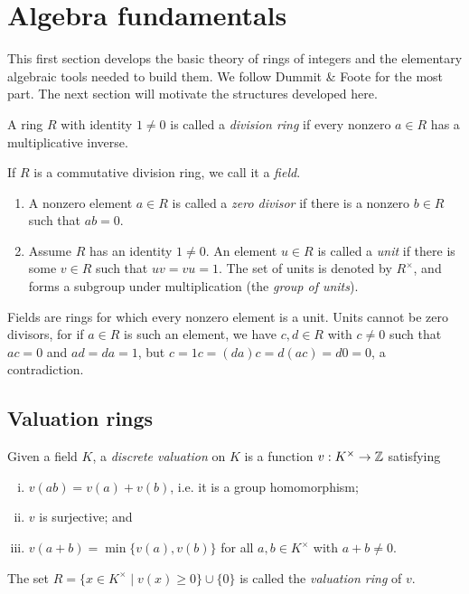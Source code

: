 \section{Algebra fundamentals}

This first section develops the basic theory of rings of integers and the elementary algebraic tools needed to build them. We follow Dummit \& Foote for the most part. The next section will motivate the structures developed here.

\begin{defn}[D\&F pp. 224]
	A ring $R$ with identity $1\neq 0$ is called a \emph{division ring} if every nonzero $a\in R$ has a multiplicative inverse.

	If $R$ is a commutative division ring, we call it a \emph{field}.
\end{defn}

\begin{defn}
	\begin{enumerate}
		\item A nonzero element $a\in R$ is called a \emph{zero divisor} if there is a nonzero $b\in R$ such that $ab=0$.
		\item Assume $R$ has an identity $1\neq 0$. An element $u\in R$ is called a \emph{unit} if there is some $v\in R$ such that $uv=vu=1$. The set of units is denoted by $R^\times$, and forms a subgroup under multiplication (the \emph{group of units}).
	\end{enumerate}
\end{defn}

Fields are rings for which every nonzero element is a unit. Units cannot be zero divisors, for if $a\in R$ is such an element, we have $c,d\in R$ with $c\neq 0$ such that $ac=0$ and $ad=da=1$, but $c=1c=(da)c=d(ac)=d0=0$, a contradiction.



\subsection{Valuation rings}

\begin{defn}
	Given a field $K$, a \emph{discrete valuation} on $K$ is a function $v:K^\times\to\mathbb{Z}$ satisfying
	\begin{enumerate}[(i)]
		\item $v(ab) = v(a)+v(b)$, i.e. it is a group homomorphism;
		\item $v$ is surjective; and
		\item $v(a+b) = \min\{v(a), v(b)\}$ for all $a,b\in K^\times$ with $a+b\neq 0$.
	\end{enumerate}

	The set $R = \{x\in K^\times \mid v(x)\geq 0\}\cup\{0\}$ is called the \emph{valuation ring} of $v$.
\end{defn}

